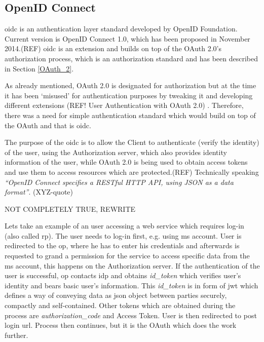 \subsection{OpenID Connect}

\acrfull{oidc} is an authentication layer standard developed by OpenID Foundation. Current version is OpenID Connect 1.0, which has been proposed in November 2014.(REF) \acrshort{oidc} is an extension and builds on top of the OAuth 2.0’s authorization process, which is an authorization standard and has been described in Section \ref{OAuth_2}. 

As already mentioned, OAuth 2.0 is designated for authorization but at the time it has been ‘misused’ for authentication purposes by tweaking it and developing different extensions (REF! User Authentication with OAuth 2.0) . Therefore, there was a need for simple authentication standard which would build on top of the OAuth and that is \acrshort{oidc}.

The purpose of the \acrshort{oidc} is to allow the Client to authenticate (verify the identity) of the user, using the Authorization server, which also provides identity information of the user, while OAuth 2.0 is being used to obtain access tokens and use them to access resources which are protected.(REF) Technically speaking \textit{“OpenID Connect specifies a RESTful HTTP API, using JSON as a data format”}.  (XYZ-quote)

NOT COMPLETELY TRUE, REWRITE

Lets take an example of an user accessing a web service which requires log-in (also called \acrfull{rp}). The user needs to log-in first, e.g. using \acrfull{ms} account. User is redirected to the \acrfull{op}, where he has to enter his credentials and afterwards is requested to grand a permission for the service to access specific data from the \acrshort{ms} account, this happens on the Authorization server. If the authentication of the user is successful, \acrshort{op} contacts \acrfull{idp} and obtains \textit{id\_token} which verifies user’s identity and bears basic user’s information. This \textit{id\_token} is in form of \acrfull{jwt} which defines a way of conveying data as \acrshort{json} object between parties securely, compactly and self-contained. Other tokens which are obtained during the process are \textit{authorization\_code} and Access Token. User is then redirected to post login \acrshort{url}. Process then continues, but it is the OAuth which does the work further.